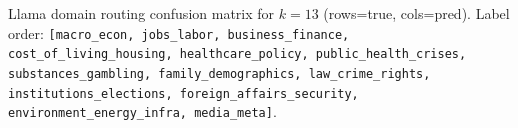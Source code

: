 \begin{table}[h]
\centering
\caption[Llama domain routing confusion matrix for $k=13$.]{Llama domain routing confusion matrix for $k=13$ (rows=true, cols=pred). Label order:
\texttt{[macro\_econ, jobs\_labor, business\_finance, cost\_of\_living\_housing, healthcare\_policy, public\_health\_crises, substances\_gambling, family\_demographics, law\_crime\_rights, institutions\_elections, foreign\_affairs\_security, environment\_energy\_infra, media\_meta]}.}
\label{tab:domain_cm_llama_k12}
\scriptsize
{}
\normalsize
\end{table}


